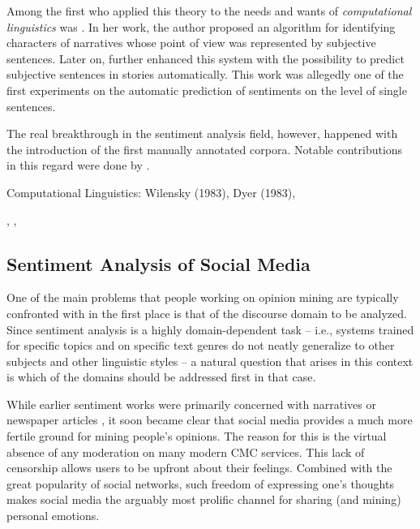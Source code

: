 Among the first who applied this theory to the needs and wants of
\emph{computational linguistics} was \citet{Wiebe:90a}.  In her work,
the author proposed an algorithm for identifying characters of
narratives whose point of view was represented by subjective
sentences.  Later on, \citet{Wiebe:94} further enhanced this system
with the possibility to predict subjective sentences in stories
automatically.  This work was allegedly one of the first experiments
on the automatic prediction of sentiments on the level of single
sentences.

The real breakthrough in the sentiment analysis field, however,
happened with the introduction of the first manually annotated
corpora.  Notable contributions in this regard were done by
\cite{Wiebe:03} \cite{Wilson:03}.

Computational Linguistics: Wilensky (1983), Dyer (1983),


\cite{Hatzivassi:97} \cite{Nasukawa:03}, \cite{Yi:03},
\cite{Kanayama:04}

\subsection{Sentiment Analysis of Social Media}

One of the main problems that people working on opinion mining are
typically confronted with in the first place is that of the discourse
domain to be analyzed.  Since sentiment analysis is a highly
domain-dependent task \citep[cf.][]{Aue:05,Blitzer:07,Li:08} -- i.e.,
systems trained for specific topics and on specific text genres do not
neatly generalize to other subjects and other linguistic styles -- a
natural question that arises in this context is which of the domains
should be addressed first in that case.

While earlier sentiment works were primarily concerned with narratives
\citep{Wiebe:90a,Wiebe:94} or newspaper articles
\citep{Wiebe:03,Wiebe:05,Bautin:08}, it soon became clear that social
media provides a much more fertile ground for mining people's
opinions.  The reason for this is the virtual absence of any
moderation on many modern CMC services.  This lack of censorship
allows users to be upfront about their feelings.  Combined with the
great popularity of social networks, such freedom of expressing one's
thoughts makes social media the arguably most prolific channel for
sharing (and mining) personal emotions.


